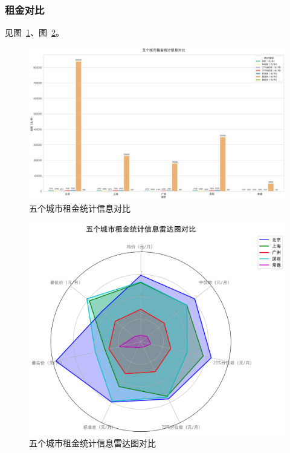 \subsubsection{租金对比}
见图~\ref{fig:price_bar_chart}、图~\ref{fig:price_radar_chart}。
\begin{figure}[htbp]
    \centering
    \includegraphics[width=0.7\linewidth]{../../figure/price_bar_chart.png}
    \caption{五个城市租金统计信息对比}
    \label{fig:price_bar_chart}
\end{figure}
\begin{figure}[htbp]
    \centering
    \includegraphics[width=0.7\linewidth]{../../figure/price_radar_chart.png}
    \caption{五个城市租金统计信息雷达图对比}
    \label{fig:price_radar_chart}
\end{figure}

